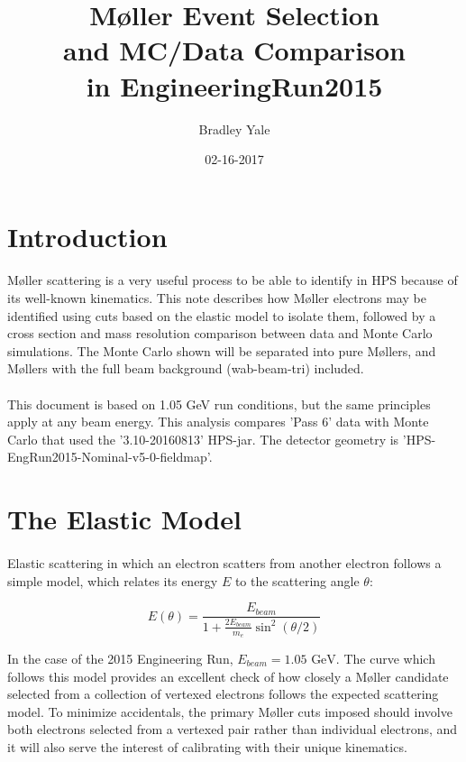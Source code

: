 \documentclass{article}
\title{M\o ller Event Selection\\and MC/Data Comparison\\in EngineeringRun2015}
\date{02-16-2017}
\author{Bradley Yale}
\begin{document}
	\maketitle
	\newpage

\section{Introduction}

	\paragraph{}
	M\o ller scattering is a very useful process to be able to identify in HPS because of its well-known kinematics. This note describes how M\o ller electrons may be identified using cuts based on the elastic model to isolate them, followed by a cross section and mass resolution comparison between data and Monte Carlo simulations. The Monte Carlo shown will be separated into pure M\o llers, and M\o llers with the full beam background (wab-beam-tri) included.
	\paragraph{}
This document is based on 1.05 GeV run conditions, but the same principles apply at any beam energy. This analysis compares 'Pass 6' data with Monte Carlo that used the '3.10-20160813' HPS-jar. The detector geometry is 'HPS-EngRun2015-Nominal-v5-0-fieldmap'.

\section{The Elastic Model}

	\paragraph{}
	Elastic scattering in which an electron scatters from another electron follows a simple model, which relates its energy $E$ to the scattering angle $\theta$:

	\begin{equation}	\label{eq:ET}
  	E(\theta) = \frac{E_{beam}}{1+\frac{2E_{beam}}{m_e}\sin^2{\left(\theta/2\right)}}
	\end{equation}\newline

	In the case of the 2015 Engineering Run, $E_{beam} = \mbox{1.05 GeV}$. The curve which follows this model provides an excellent check of how closely a M\o ller candidate selected from a collection of vertexed electrons follows the expected scattering model. 
	To minimize accidentals, the primary M\o ller cuts imposed should involve both electrons selected from a vertexed pair rather than individual electrons, and it will also serve the interest of calibrating with their unique kinematics.
\end{document}
